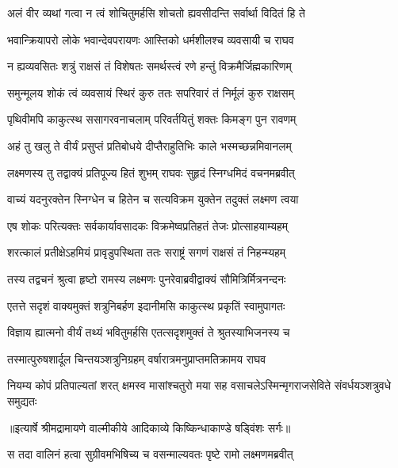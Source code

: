 \twolineshloka
{अलं वीर व्यथां गत्वा न त्वं शोचितुमर्हसि}
{शोचतो ह्यवसीदन्ति सर्वार्था विदितं हि ते} %

\twolineshloka
{भवान्क्रियापरो लोके भवान्देवपरायणः}
{आस्तिको धर्मशीलश्च व्यवसायी च राघव} %

\twolineshloka
{न ह्यव्यवसितः शत्रुं राक्षसं तं विशेषतः}
{समर्थस्त्वं रणे हन्तुं विक्रमैर्जिह्मकारिणम्} %

\twolineshloka
{समुन्मूलय शोकं त्वं व्यवसायं स्थिरं कुरु}
{ततः सपरिवारं तं निर्मूलं कुरु राक्षसम्} %

\twolineshloka
{पृथिवीमपि काकुत्स्थ ससागरवनाचलाम्}
{परिवर्तयितुं शक्तः किमङ्ग पुन रावणम्} %

\twolineshloka
{अहं तु खलु ते वीर्यं प्रसुप्तं प्रतिबोधये}
{दीप्तैराहुतिभिः काले भस्मच्छन्नमिवानलम्} %

\twolineshloka
{लक्ष्मणस्य तु तद्वाक्यं प्रतिपूज्य हितं शुभम्}
{राघवः सुहृदं स्निग्धमिदं वचनमब्रवीत्} %

\twolineshloka
{वाच्यं यदनुरक्तेन स्निग्धेन च हितेन च}
{सत्यविक्रम युक्तेन तदुक्तं लक्ष्मण त्वया} %

\twolineshloka
{एष शोकः परित्यक्तः सर्वकार्यावसादकः}
{विक्रमेष्वप्रतिहतं तेजः प्रोत्साहयाम्यहम्} %

\twolineshloka
{शरत्कालं प्रतीक्षेऽहमियं प्रावृडुपस्थिता}
{ततः सराष्ट्रं सगणं राक्षसं तं निहन्म्यहम्} %

\twolineshloka
{तस्य तद्वचनं श्रुत्वा हृष्टो रामस्य लक्ष्मणः}
{पुनरेवाब्रवीद्वाक्यं सौमित्रिर्मित्रनन्दनः} %

\twolineshloka
{एतत्ते सदृशं वाक्यमुक्तं शत्रुनिबर्हण}
{इदानीमसि काकुत्स्थ प्रकृतिं स्वामुपागतः} %

\twolineshloka
{विज्ञाय ह्यात्मनो वीर्यं तथ्यं भवितुमर्हसि}
{एतत्सदृशमुक्तं ते श्रुतस्याभिजनस्य च} %

\twolineshloka
{तस्मात्पुरुषशार्दूल चिन्तयञ्शत्रुनिग्रहम्}
{वर्षारात्रमनुप्राप्तमतिक्रामय राघव} %

\fourlineindentedshloka
{नियम्य कोपं प्रतिपाल्यतां शरत्}
{क्षमस्व मासांश्चतुरो मया सह}
{वसाचलेऽस्मिन्मृगराजसेविते}
{संवर्धयञ्शत्रुवधे समुद्यतः} %


{॥इत्यार्षे श्रीमद्रामायणे वाल्मीकीये आदिकाव्ये किष्किन्धाकाण्डे षड्विंशः सर्गः॥}


\twolineshloka
{स तदा वालिनं हत्वा सुग्रीवमभिषिच्य च}
{वसन्माल्यवतः पृष्टे रामो लक्ष्मणमब्रवीत्} %

